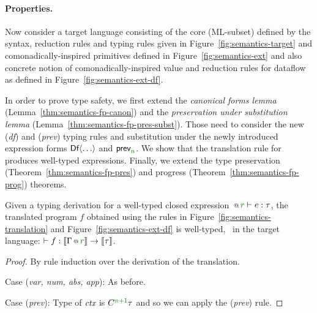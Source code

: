 \paragraph{Properties.}
Now consider a target language consisting of the core (ML-subset) defined by the syntax,
reduction rules and typing rules given in Figure~\ref{fig:semantics-target} and comonadically-inspired
primitives defined in Figure~\ref{fig:semantics-ext} and also concrete notion of comonadically-inspired
value and reduction rules for dataflow as defined in Figure~\ref{fig:semantics-ext-df}.

In order to prove type safety, we first extend the \emph{canonical forms lemma}
(Lemma~\ref{thm:semantics-fp-canon}) and the \emph{preservation under substitution lemma}
(Lemma~\ref{thm:semantics-fp-pres-subst}). Those need to consider the new (\emph{df})
and (\emph{prev}) typing rules and substitution under the newly introduced expression forms
$\textnormal{\sffamily Df}\langle\ldots\rangle$ and $\ident{prev}_{\cclrd{n}}$. We show that the translation
rule for  produces well-typed expressions. Finally, we extend the type preservation
(Theorem~\ref{thm:semantics-fp-pres}) and progress (Theorem~\ref{thm:semantics-fp-prog}) theorems.

\begin{theorem}
\label{thm:semantics-df-welltyped}
Given a typing derivation for a well-typed closed expression $\coctx{}{\cclrd{r}} \vdash e : \tau$,
the translated program $f$ obtained using the rules in Figure~\ref{fig:semantics-translation}
and Figure~\ref{fig:semantics-ext-df} is well-typed, \ie~in the target language: $\vdash f : \sem{\coctx{\Gamma}{\cclrd{r}}} \rightarrow \sem{\tau}$.
\end{theorem}
\begin{proof}
By rule induction over the derivation of the translation.

\vspace{0.5em}\noindent\hangindent=0.6cm
Case (\emph{var, num, abs, app}): As before.

\vspace{0.5em}\noindent\hangindent=0.6cm
Case (\emph{prev}): Type of $\textit{ctx}$ is $\ctyp{\cclrd{n+1}}\tau$ and so we can apply the (\emph{prev}) rule.
\end{proof}

